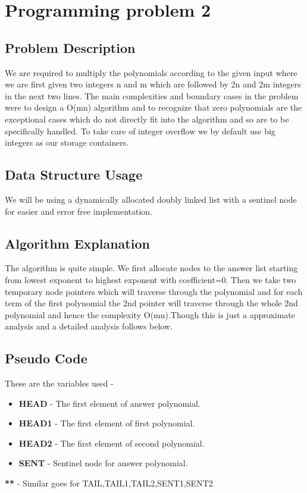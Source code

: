 \documentclass[20pt]{article}
\begin{document}
\newpage
\section{Programming problem 2}

\subsection{Problem Description}
We are required to multiply the polynomials according to the given input where we are first given two integers n and m which are followed by {2n} and {2m} integers in the next two lines.
The main complexities and boundary cases in the problem were to design a {O(mn)} algorithm and to recognize that zero polynomials are the exceptional cases which do not directly fit into the algorithm and so are to be specifically handled. To take care of integer overflow we by default use big integers as our storage containers.

\subsection{Data Structure Usage}
We will be using a dynamically allocated doubly linked list with a sentinel node for easier and error free implementation.

\subsection{Algorithm Explanation}
The algorithm is quite simple. We first allocate nodes to the answer list starting from lowest exponent to highest exponent with coefficient=0. Then we take two temporary node pointers which will traverse through the polynomial and for each term of the first polynomial the 2nd pointer will traverse through the whole 2nd polynomial and hence the complexity {O(mn)}.Though this is just a approximate analysis and a detailed analysis follows below.

\subsection{Pseudo Code}
These are the variables used - 

\begin{itemize}
\item \textbf{HEAD}   - The first element of answer polynomial.
\item \textbf{HEAD1} - The first element of first polynomial.
\item \textbf{HEAD2} - The first element of second polynomial.
\item \textbf{SENT}   - Sentinel node for answer polynomial.
\end{itemize}
\textbf{**} - Similar goes for {TAIL,TAIL1,TAIL2,SENT1,SENT2}
\end{document}
